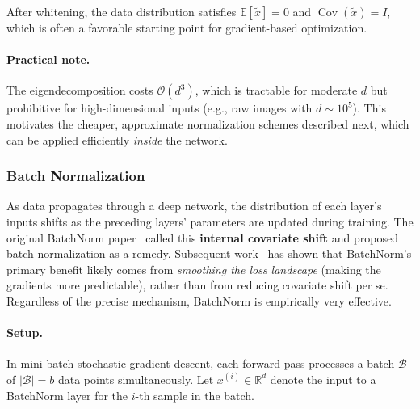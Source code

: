 After whitening, the data distribution satisfies $\mathbb{E}[\tilde{x}] = 0$ and $\operatorname{Cov}(\tilde{x}) = I$, which is often a favorable starting point for gradient-based optimization.

\paragraph{Practical note.}
The eigendecomposition costs $\mathcal{O}(d^3)$, which is tractable for moderate $d$ but prohibitive for high-dimensional inputs (e.g., raw images with $d \sim 10^5$). This motivates the cheaper, approximate normalization schemes described next, which can be applied efficiently \emph{inside} the network.

\subsubsection{Batch Normalization}

As data propagates through a deep network, the distribution of each layer's inputs shifts as the preceding layers' parameters are updated during training.
The original BatchNorm paper~\cite{ioffe2015batch} called this \textbf{internal covariate shift} and proposed batch normalization as a remedy.
Subsequent work~\cite{santurkar2018does} has shown that BatchNorm's primary benefit likely comes from \emph{smoothing the loss landscape} (making the gradients more predictable), rather than from reducing covariate shift per se.
Regardless of the precise mechanism, BatchNorm is empirically very effective.

\paragraph{Setup.}
In mini-batch stochastic gradient descent, each forward pass processes a batch $\mathcal{B}$ of $|\mathcal{B}| = b$ data points simultaneously.
Let $x^{(i)} \in \mathbb{R}^d$ denote the input to a BatchNorm layer for the $i$-th sample in the batch.

